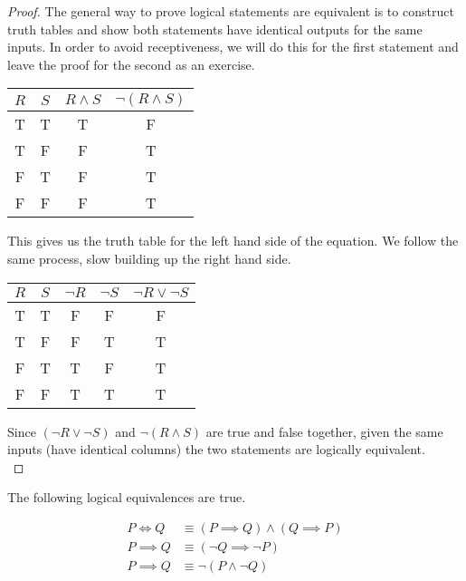 \documentclass[twoside]{report}
\begin{document}
\begin{proof}
	The general way to prove logical statements are equivalent is to construct truth tables and show both statements have identical outputs for the same inputs. In order to avoid receptiveness, we will do this for the first statement and leave the proof for the second as an exercise.
	
	\vspace{\baselineskip}
	\begin{center}
		\begin{tabular}{cccc}
			$R$ & $S$ & $R \wedge S$ & $\neg(R \wedge S)$ \\
			\midrule
			T & T & T & F \\
			T & F & F & T \\
			F & T & F & T \\
			F & F & F & T \\
		\end{tabular}
	\end{center}
	\vspace{\baselineskip}
	
	This gives us the truth table for the left hand side of the equation. We follow the same process, slow building up the right hand side.
	
	\vspace{\baselineskip}
	\begin{center}
		\begin{tabular}{ccccc}
			$R$ & $S$ & $\neg R$ & $\neg S$ & $\neg R \lor \neg S$ \\
			\midrule
			T & T & F & F & F \\
			T & F & F & T & T \\
			F & T & T & F & T \\
			F & F & T & T & T \\
		\end{tabular}
	\end{center}
	
	Since $(\neg R \lor \neg S)$ and $\neg(R \wedge S)$ are true and false together, given the same inputs (have identical columns) the two statements are logically equivalent. \\
\end{proof}
\vspace{\baselineskip}

\vspace{\baselineskip}
\begin{theorem}
	The following logical equivalences are true.
	
	\begin{align}
		P \iff Q &\equiv (P \implies Q) \wedge (Q \implies P) \\
		P \implies Q &\equiv (\neg Q \implies \neg P) \\
		P \implies Q &\equiv \neg (P \wedge \neg Q)
	\end{align}
\end{theorem}
\end{document}
